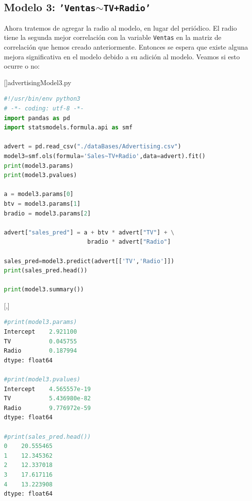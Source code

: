 \subsection{Modelo 3: \texttt{'Ventas$\sim$TV+Radio'}}

Ahora tratemos de agregar la radio al modelo, en lugar del periódico. El radio tiene la segunda mejor correlación con la variable \texttt{Ventas} en la matriz de correlación que hemos creado anteriormente.  Entonces se espera que existe alguna mejora significativa en el modelo debido a su adición al modelo.  Veamos si esto ocurre o no:

[]{advertisingModel3.py} 
\begin{lstlisting}[language=Python]
#!/usr/bin/env python3
# -*- coding: utf-8 -*-
import pandas as pd
import statsmodels.formula.api as smf

advert = pd.read_csv("./dataBases/Advertising.csv")
model3=smf.ols(formula='Sales~TV+Radio',data=advert).fit()
print(model3.params)
print(model3.pvalues)

a = model3.params[0]
btv = model3.params[1]
bradio = model3.params[2]

advert["sales_pred"] = a + btv * advert["TV"] + \
                        bradio * advert["Radio"]

sales_pred=model3.predict(advert[['TV','Radio']])
print(sales_pred.head())

print(model3.summary())
\end{lstlisting}


[,]{}
\begin{lstlisting}[language=Python]
#print(model3.params)
Intercept    2.921100
TV           0.045755
Radio        0.187994
dtype: float64

#print(model3.pvalues)
Intercept    4.565557e-19
TV           5.436980e-82
Radio        9.776972e-59
dtype: float64

#print(sales_pred.head())
0    20.555465
1    12.345362
2    12.337018
3    17.617116
4    13.223908
dtype: float64
\end{lstlisting}

